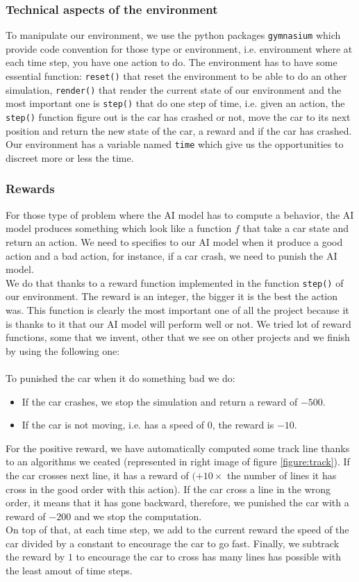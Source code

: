 \documentclass[11pt,a4paper]{article}
\newcounter{fig}
\newcommand{\mlist}[1]{\begin{itemize}[noitemsep,topsep=0pt]#1\end{itemize}}
\begin{document}
			\subsubsection*{Technical aspects of the environment}
To manipulate our environment, we use the python packages \texttt{gymnasium} which provide code convention for those type or environment, i.e. environment where at each time step, you have one action to do. The environment has to have some essential function: \texttt{reset()} that reset the environment to be able to do an other simulation, \texttt{render()} that render the current state of our environment and the most important one is \texttt{step()} that do one step of time, i.e. given an action, the \texttt{step()} function figure out is the car has crashed or not, move the car to its next position and return the new state of the car, a reward and if the car has crashed.\\
Our environment has a variable named \texttt{time} which give us the opportunities to discreet more or less the time.
		
			\subsubsection*{Rewards}
For those type of problem where the AI model has to compute a behavior, the AI model produces something which look like a function $f$ that take a car state and return an action. We need to specifies to our AI model when it produce a good action and a bad action, for instance, if a car crash, we need to punish the AI model.\\
We do that thanks to a reward function implemented in the function \texttt{step()} of our environment. The reward is an integer, the bigger it is the best the action was. This function is clearly the most important one of all the project because it is thanks to it that our AI model will perform well or not. We tried lot of reward functions, some that we invent, other that we see on other projects and we finish by using the following one:\\
\\
To punished the car when it do something bad we do:
\mlist{
\item If the car crashes, we stop the simulation and return a reward of $-500$.
\item If the car is not moving, i.e. has a speed of $0$, the reward is $-10$.
}
For the positive reward, we have automatically computed some track line thanks to an algorithms we ceated (represented in right image of figure \ref{figure:track}). If the car crosses next line, it has a reward of $(+10\times$ the number of lines it has cross in the good order with this action). If the car cross a line in the wrong order, it means that it has gone backward, therefore, we punished the car with a reward of $-200$ and we stop the computation.\\
On top of that, at each time step, we add to the current reward the speed of the car divided by a constant to encourage the car to go fast. Finally, we subtrack the reward by $1$ to encourage the car to cross has many lines has possible with the least amout of time steps.
\end{document}
